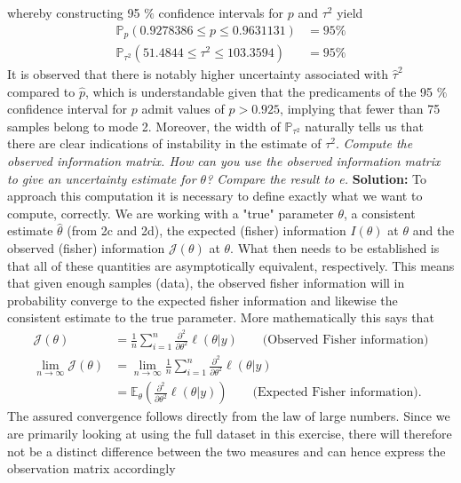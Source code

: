 whereby constructing 95 $\%$ confidence intervals for $p$ and $\tau^2$ yield 
\begin{align}
    \mathbb{P}_{p} \left(0.9278386  \leq p \leq  0.9631131\right) &= 95 \% \\[5pt]
      \mathbb{P}_{\tau^2} \left(  51.4844 \leq \tau^2 \leq  103.3594 \right) &= 95 \% 
\end{align}
It is observed that there is notably higher uncertainty associated with $\hat{\tau}^2$ compared to $\hat{p}$, which is understandable given that the predicaments of the 95 $\%$ confidence interval for $p$ admit values of $p > 0.925$, implying that fewer than 75 samples belong to mode 2. Moreover, the width of $\mathbb{P}_{\tau^2}$ naturally tells us that there are clear indications of instability in the estimate of $\tau^2$.
\emph{Compute the observed information matrix. How can you use the observed information matrix to give an uncertainty estimate for $\theta$? Compare the result to e.} \spaze
\textbf{Solution:} \spaze
To approach this computation it is necessary to define exactly what we want to compute, correctly. We are working with a "true" parameter $\theta$, a consistent estimate $\hat{\theta}$ (from 2c and 2d), the expected (fisher) information $I(\theta)$ at $\theta$ and the observed (fisher) information $\mathcal{J}(\theta)$ at $\theta$. \spaze
What then needs to be established is that all of these quantities are asymptotically equivalent, respectively. This means that given enough samples (data), the observed fisher information will in probability converge to the expected fisher information and likewise the consistent estimate to the true parameter. More mathematically this says that 
\begin{align}
    \mathcal{J}(\theta) &= \frac{1}{n} \sum_{i=1}^{n} \frac{\partial^2}{\partial \theta^2} \ell(\theta|y) \qquad \text{(Observed Fisher information)} \\[5pt]
    \lim_{n \to \infty}  \mathcal{J}(\theta) &= \lim_{n \to \infty} \frac{1}{n} \sum_{i=1}^{n} \frac{\partial^2}{\partial \theta^2} \ell(\theta|y) \\[5pt] 
    &= \mathbb{E}_{\theta} \left( \frac{\partial^2}{\partial \theta^2} \ell(\theta|y) \right) \qquad \text{(Expected Fisher information)}.
    \end{align}
The assured convergence follows directly from the law of large numbers. \spaze 
Since we are primarily looking at using the full dataset in this exercise, there will therefore not be a distinct difference between the two measures and can hence express the observation matrix accordingly 
